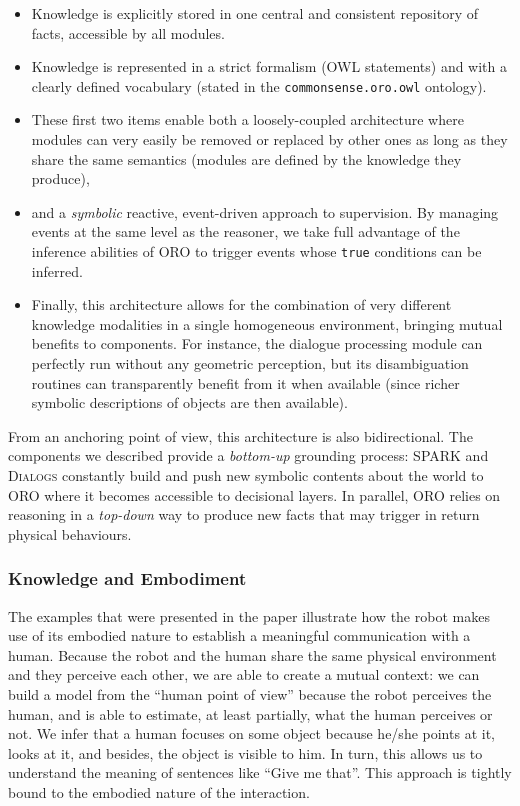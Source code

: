 \documentclass{svmult}
\begin{document}
\begin{itemize}
\item{Knowledge is explicitly stored in one central and consistent repository
of facts, accessible by all modules.}
\item{Knowledge is represented in a strict formalism (OWL statements) and
with a clearly defined vocabulary (stated in the {\tt commonsense.oro.owl}
ontology).}
\item{These first two items enable both a loosely-coupled
architecture where modules can very easily be removed or replaced by other ones
as long as they share the same semantics (modules are defined by the knowledge
they produce),}
\item{and a \emph{symbolic} reactive, event-driven approach
to supervision. By managing events at the same level as
the reasoner, we take full advantage of the inference abilities of ORO to
trigger events whose \texttt{true} conditions can be inferred.}
\item{Finally, this architecture allows for the combination of very different knowledge
modalities in a single homogeneous environment, bringing mutual benefits to
components. For instance, the dialogue processing module can perfectly run
without any geometric perception, but its disambiguation routines can
transparently benefit from it when available (since richer symbolic
descriptions of objects are then available).}
\end{itemize}

From an anchoring point of view, this architecture is also
bidirectional. The components we described provide a \textit{bottom-up}
grounding process: SPARK and \textsc{Dialogs} constantly build and push new
symbolic contents about the world to ORO where it becomes accessible to
decisional layers. In parallel, ORO relies on reasoning in a \textit{top-down}
way to produce new facts that may trigger in return physical behaviours. 

\subsubsection*{Knowledge and Embodiment}

The examples that were presented in the paper illustrate how the robot makes
use of its embodied nature to establish a meaningful communication with a
human. Because the robot and the human share the same physical environment and
they perceive each other, we are able to create a mutual context: we can build
a model from the ``human point of view'' because the robot perceives the human,
and is able to estimate, at least partially, what the human perceives or not.
We infer that a human focuses on some object because he/she points at it, looks
at it, and besides, the object is visible to him.  In turn, this allows us to
understand the meaning of sentences like ``Give me that''. This approach is
tightly bound to the embodied nature of the interaction.









\end{document}
